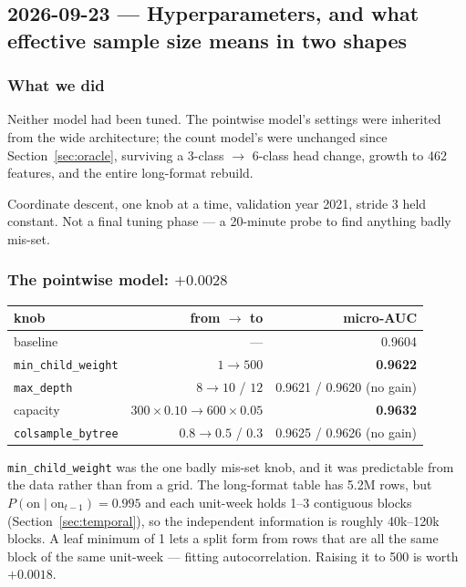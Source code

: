 \subsection{2026-09-23 --- Hyperparameters, and what effective sample size means in two shapes}
\label{sec:tuning}

\subsubsection*{What we did}

Neither model had been tuned. The pointwise model's settings were inherited from the wide
architecture; the count model's were unchanged since Section~\ref{sec:oracle}, surviving a
3-class $\to$ 6-class head change, growth to 462 features, and the entire long-format rebuild.

Coordinate descent, one knob at a time, validation year 2021, stride 3 held constant. Not a final
tuning phase --- a 20-minute probe to find anything badly mis-set.

\subsubsection*{The pointwise model: $+0.0028$}

\begin{center}\small
\begin{tabular}{lrr}
\toprule
knob & from $\to$ to & micro-AUC \\
\midrule
baseline & --- & 0.9604 \\
\texttt{min\_child\_weight} & $1 \to 500$ & \textbf{0.9622} \\
\texttt{max\_depth} & $8 \to 10$ / $12$ & 0.9621 / 0.9620 (no gain) \\
capacity & $300{\times}0.10 \to 600{\times}0.05$ & \textbf{0.9632} \\
\texttt{colsample\_bytree} & $0.8 \to 0.5$ / $0.3$ & 0.9625 / 0.9626 (no gain) \\
\bottomrule
\end{tabular}
\end{center}

\begin{finding}
\texttt{min\_child\_weight} was the one badly mis-set knob, and it was predictable from the data
rather than from a grid. The long-format table has 5.2M rows, but
$P(\text{on}\mid\text{on}_{t-1}) = 0.995$ and each unit-week holds 1--3 contiguous blocks
(Section~\ref{sec:temporal}), so the independent information is roughly 40k--120k blocks. A leaf
minimum of 1 lets a split form from rows that are all the same block of the same unit-week ---
fitting autocorrelation. Raising it to 500 is worth $+0.0018$.
\end{finding}

